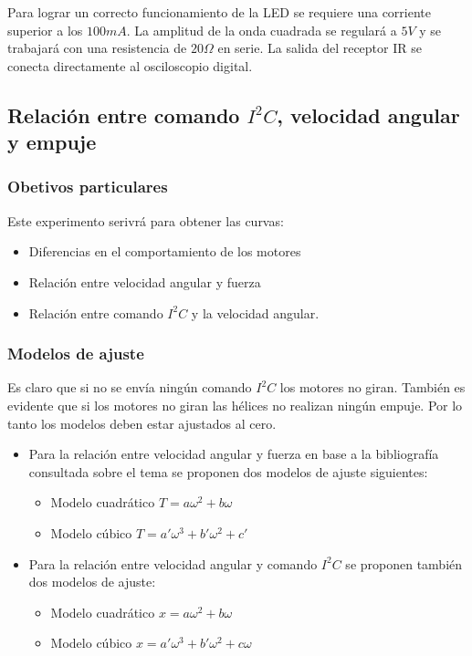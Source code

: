\documentclass[main]{subfiles}
\begin{document}
Para lograr un correcto funcionamiento de la LED se requiere una corriente superior a los $100mA$. La amplitud de la onda cuadrada se regular\'a a $5V$ y se trabajar\'a con una resistencia de $20\Omega$ en serie. La salida del receptor IR se conecta directamente al osciloscopio digital.\\

\subsection{Relaci\'on entre comando $I^2C$, velocidad angular y empuje}

\subsubsection*{Obetivos particulares}
Este experimento serivr\'a para obtener las curvas:
\begin{itemize}
\item Diferencias en el comportamiento de los motores
\item Relaci\'on entre velocidad angular y fuerza
\item Relaci\'on entre comando $I^2C$ y la velocidad angular.
\end{itemize}

\subsubsection*{Modelos de ajuste}

Es claro que si no se env\'ia ning\'un comando $I^2C$ los motores no giran. Tambi\'en es evidente que si los motores no giran las h\'elices no realizan ning\'un empuje. Por lo tanto los modelos deben estar ajustados al cero. 
\begin{itemize}


\item Para la relaci\'on entre velocidad angular y fuerza en base a la bibliograf\'ia consultada sobre el tema se proponen dos modelos de ajuste siguientes:

	\begin{itemize}
	\item Modelo cuadr\'atico $T=a\omega^2+b\omega$
	\item Modelo c\'ubico $T=a\prime \omega^3+b\prime \omega^2+c\prime$
	\end{itemize}

\item Para la relaci\'on entre velocidad angular y comando $I^2C$ se proponen tambi\'en dos modelos de ajuste:
	\begin{itemize}
	\item Modelo cuadr\'atico $x=a\omega^2+b\omega$
	\item Modelo c\'ubico $x =a\prime \omega^3+b\prime \omega^2+c\omega$	
	
	\end{itemize}


\end{itemize}
\end{document}
